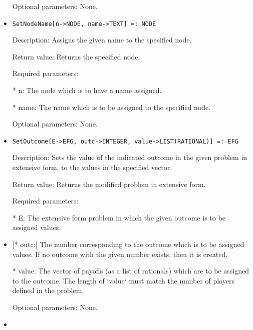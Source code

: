 \begin{itemize}
\item
[Optional parameters:] None.
\ed

\item

\begin{verbatim}
SetNodeName[n->NODE, name->TEXT] =: NODE
\end{verbatim}

\bd
\item
[Description:] Assigns the given name to the specified node.
\item
[Return value:] Returns the specified node.
\item
[Required parameters:]\hfil\null
	
\bd
\item
[* n:] The node which is to have a name assigned.
\item
[* name:] The name which is to be assigned to the specified node.
\ed

\item
[Optional parameters:] None.
\ed

\item
\begin{verbatim}
SetOutcome[E->EFG, outc->INTEGER, value->LIST(RATIONAL)] =: EFG
\end{verbatim}
   
\bd
\item
[Description:] Sets the value of the indicated outcome in the given 
problem in extensive form, to the values in the specified vector.
\item
[Return value:] Returns the modified problem in extensive form. 
\item
[Required parameters:]\hfil\null
	
\bd
\item
[* E:] The extensive form problem in which the given outcome is to be
assigned values.
\item

[* outc:] The number corresponding to the outcome which is to be 
assigned values.  If no outcome with the given number exists,
then it is created.
\item
[* value:] The vector of payoffs (as a list of rationals) which are 
to be assigned to the outcome.  The length of `value` must 
match the number of players defined in the problem.
\ed

\item
[Optional parameters:] None.
\ed

\item


\end{itemize}
